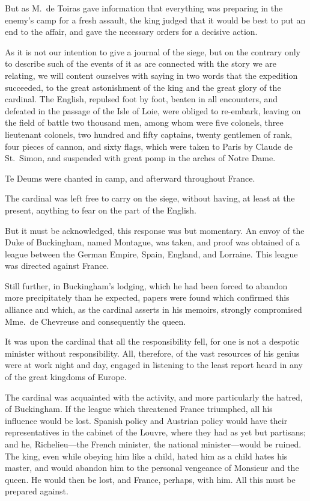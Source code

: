But as M.~de Toiras gave information that everything was preparing in the enemy's camp for a fresh assault, the king judged that it would be best to put an end to the affair, and gave the necessary orders for a decisive action. 

As it is not our intention to give a journal of the siege, but on the contrary only to describe such of the events of it as are connected with the story we are relating, we will content ourselves with saying in two words that the expedition succeeded, to the great astonishment of the king and the great glory of the cardinal. The English, repulsed foot by foot, beaten in all encounters, and defeated in the passage of the Isle of Loie, were obliged to re-embark, leaving on the field of battle two thousand men, among whom were five colonels, three lieutenant colonels, two hundred and fifty captains, twenty gentlemen of rank, four pieces of cannon, and sixty flags, which were taken to Paris by Claude de St.~Simon, and suspended with great pomp in the arches of Notre Dame. 

Te Deums were chanted in camp, and afterward throughout France. 

The cardinal was left free to carry on the siege, without having, at least at the present, anything to fear on the part of the English. 

But it must be acknowledged, this response was but momentary. An envoy of the Duke of Buckingham, named Montague, was taken, and proof was obtained of a league between the German Empire, Spain, England, and Lorraine. This league was directed against France. 

Still further, in Buckingham's lodging, which he had been forced to abandon more precipitately than he expected, papers were found which confirmed this alliance and which, as the cardinal asserts in his memoirs, strongly compromised Mme.~de Chevreuse and consequently the queen. 

It was upon the cardinal that all the responsibility fell, for one is not a despotic minister without responsibility. All, therefore, of the vast resources of his genius were at work night and day, engaged in listening to the least report heard in any of the great kingdoms of Europe. 

The cardinal was acquainted with the activity, and more particularly the hatred, of Buckingham. If the league which threatened France triumphed, all his influence would be lost. Spanish policy and Austrian policy would have their representatives in the cabinet of the Louvre, where they had as yet but partisans; and he, Richelieu—the French minister, the national minister—would be ruined. The king, even while obeying him like a child, hated him as a child hates his master, and would abandon him to the personal vengeance of Monsieur and the queen. He would then be lost, and France, perhaps, with him. All this must be prepared against. 

